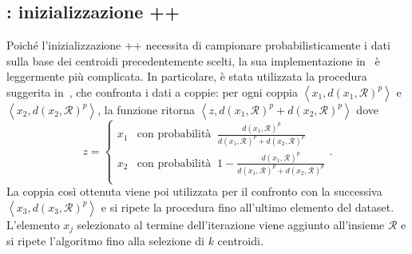 \documentclass[runningheads]{llncs}
\begin{document}
\subsection*{\mr: inizializzazione ++}
Poiché l'inizializzazione ++ necessita di campionare probabilisticamente i dati sulla base dei centroidi precedentemente scelti, la sua implementazione in \mr\ è leggermente più complicata. In particolare, è stata utilizzata la procedura suggerita in~\cite{bodoia}, che confronta i dati a coppie: per ogni coppia $\left<x_1, d(x_1, \mathcal{R})^{p}\right>$ e $\left< x_2 , d(x_2, \mathcal{R})^{p}  \right>$, la funzione ritorna $\left<z,  d(x_1, \mathcal{R})^{p} + d(x_2, \mathcal{R})^{p}\right>$ dove
\[
    z = \begin{cases}
        x_1 & \text{con probabilità }\ \frac{d(x_1, \mathcal{R})^{p}}{d(x_1, \mathcal{R})^{p} + d(x_2, \mathcal{R})^{p}}\\[.2cm]
        x_2 & \text{con probabilità }\ 1 - \frac{d(x_1, \mathcal{R})^{p}}{d(x_1, \mathcal{R})^{p} + d(x_2, \mathcal{R})^{p}}\\
    \end{cases}.
\]
La coppia così ottenuta viene poi utilizzata per il confronto con la successiva $\left< x_3 , d(x_3, \mathcal{R})^{p} \right>$ e si ripete la procedura fino all'ultimo elemento del dataset. L'elemento $x_j$ selezionato al termine dell'iterazione viene aggiunto all'insieme $\mathcal{R}$ e si ripete l'algoritmo fino alla selezione di $k$ centroidi.
\end{document}
